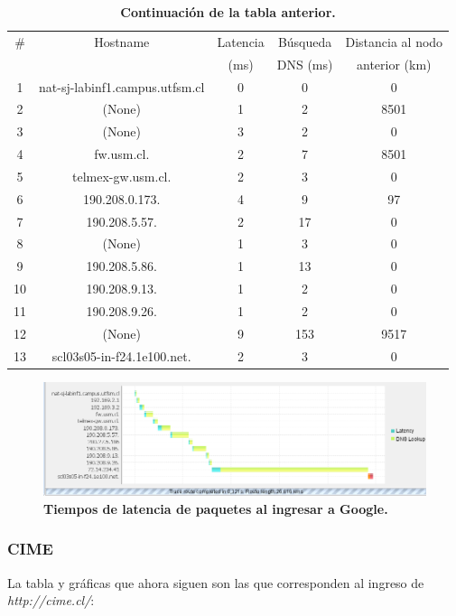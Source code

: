 \documentclass[12pt]{article}
\begin{document}
\begin{table}[H]
\centering
\begin{tabular}{| c | c | c | c | c |}
\hline
\# & Hostname & Latencia & Búsqueda & Distancia al nodo\\
 &  & (ms) & DNS (ms) & anterior (km)\\
\hline
1 & nat-sj-labinf1.campus.utfsm.cl & 0 & 0 & 0\\
\hline
2 & (None) & 1 & 2 & 8501\\
\hline
3 & (None) & 3 & 2 & 0\\
\hline
4 & fw.usm.cl. & 2 & 7 & 8501\\
\hline
5 & telmex-gw.usm.cl. & 2 & 3 & 0\\
\hline
6 & 190.208.0.173. & 4 & 9 & 97\\
\hline
7 & 190.208.5.57. & 2 & 17 & 0\\
\hline
8 & (None) & 1 & 3 & 0\\
\hline
9 & 190.208.5.86. & 1 & 13 & 0\\
\hline
10 & 190.208.9.13. & 1 & 2 & 0\\
\hline
11 & 190.208.9.26. & 1 & 2 & 0\\
\hline
12 & (None) & 9 & 153 & 9517\\
\hline
13 &  scl03s05-in-f24.1e100.net. & 2 & 3 & 0\\
\hline
\end{tabular}
\caption{\small \textbf{Continuación de la tabla anterior.}}
\end{table}

\begin{figure}[H] 
\centering 
\includegraphics[width=1\textwidth]{imagenes/google_grafica.png} \caption{\small \textbf{Tiempos de latencia de paquetes al ingresar a Google.}} 
\label{fig:diagrama_2} 
\end{figure}

\subsubsection{CIME}
La tabla y gráficas que ahora siguen son las que corresponden al ingreso de \emph{http://cime.cl/}:\\
\end{document}
